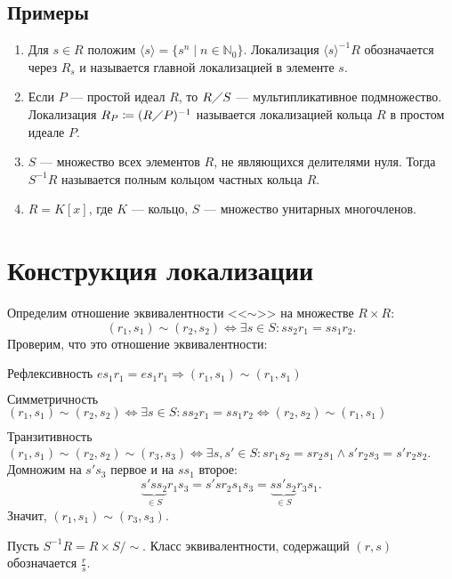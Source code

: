 \documentclass[11pt]{book}
\newcommand{\N}{\mathbb{N}}
\newcommand{\po}{\diagup}
\theoremstyle{definition}
\theoremstyle{plain}
\theoremstyle{plain}
\theoremstyle{definition}
\theoremstyle{remark}
\begin{document}
\subsection{Примеры}
\begin{enumerate}
    \item Для $ s \in R$ положим $ \langle s \rangle = \{s^{n} \mid n \in \N_0\}$. Локализация $ \langle s \rangle^{-1} R $ обозначается через $ R_s$ и называется {\sf главной локализацией в элементе $ s$}.  
    \item Если $ P$ --- простой идеал  $ R$, то  $ R \po S$ --- мультипликативное подмножество. 
	Локализация  $ R_{P} \coloneqq (R \po P)^{-1}$ называется {\sf локализацией кольца $ R$ в простом идеале  $ P$}.
    \item  $ S$ --- множество всех элементов   $ R$, не являющихся делителями нуля. Тогда  $ S^{-1}R$ называется {\sf полным кольцом частных кольца $ R$}.
    \item  $ R = K[x]$, где  $ K$ --- кольцо,  $ S$ --- множество унитарных многочленов.
\end{enumerate}
\section{Конструкция локализации}
Определим отношение эквивалентности <<$ \sim $>> на множестве $ R \times R$:
\[
    (r_1, s_1) \sim (r_2, s_2) \Longleftrightarrow \exists s \in  S: ss_2r_1 = ss_1r_2
.\]
Проверим, что это отношение эквивалентности:
\begin{description}
    \item $ \boxed{\text{Рефлексивность}}$ $ e s_1r_1 = e s_1r_1 \Longrightarrow (r_1, s_1) \sim (r_1, s_1)$
    \item $ \boxed{\text{Симметричность}}$ $ (r_1, s_1) \sim (r_2, s_2) \Longleftrightarrow \exists s \in S: ss_2r_1 = ss_1r_2 \Longleftrightarrow (r_2, s_2) \sim (r_1, s_1)$
    \item $ \boxed{\text{Транзитивность}}$  $ (r_1, s_1) \sim (r_2 , s_2) \sim (r_3, s_3) \Longleftrightarrow \exists s, s' \in S: s r_1 s_2 = s r_2 s_1 \wedge s'r_2 s_3 = s' r_2s_2$. Домножим на $ s's_3$ первое и на $ ss_1$ второе:
	\[
	    \underbrace{s'ss_2}_{\in S}r_1s_3 = s's r_2 s_1 s_3 = \underbrace{s s' s_2}_{ \in S} r_3 s_1
	.\]
	Значит, $ (r_1, s_1) \sim (r_3, s_3)$.
\end{description}
Пусть $ S^{-1}R = R \times S / \sim $.  Класс эквивалентности, содержащий $ (r, s)$ обозначается  $ \frac{r}{s}$.
\end{document}
